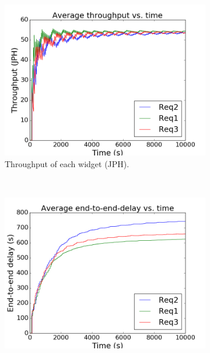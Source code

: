 \begin{figure}[!t]
\centering
    \begin{subfigure}[t]{0.33\linewidth}
        \centering
\includegraphics[width=0.99\columnwidth]{Figures/b2-throughput}
\caption{Throughput of each widget (JPH).}
\label{fig:linear_jph}
    \end{subfigure}%
        ~%
    \begin{subfigure}[t]{0.33\linewidth}
        \centering     
\includegraphics[width=0.99\columnwidth]{Figures/b2-end-to-end}

\end{subfigure}
\end{figure}

